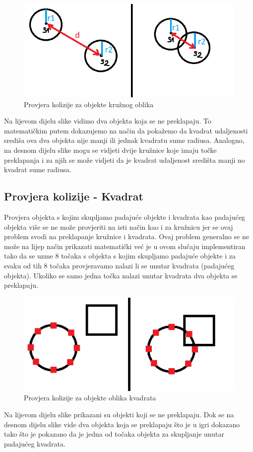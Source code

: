 \documentclass[times, utf8, zavrsni]{fer}
\begin{document}
		\begin{figure}[H]
			\includegraphics[scale=0.6]{"slike/circlekolizija.png"} 
			\centering
			\caption{Provjera kolizije za objekte kružnog oblika}
			\label{fig:kolizijacircle}
		\end{figure}
	
	Na lijevom dijelu slike vidimo dva objekta koja se ne preklapaju. To matematičkim putem dokazujemo na način da pokažemo da kvadrat udaljenosti središa ova dva objekta nije manji ili jednak kvadratu sume radiusa. Analogno, na desnom dijelu slike
	mogu se vidjeti dvije kružnice koje imaju točke preklapanja i za njih se može vidjeti da je kvadrat udaljenost središta manji no kvadrat sume radiusa. 
	
	\subsection{Provjera kolizije - Kvadrat}
	Provjera objekta s kojim skupljamo padajuće objekte i kvadrata kao padajućeg objekta više se ne može provjeriti na isti način kao i za kružnicu jer se ovaj problem svodi na preklapanje kružnice i kvadrata.
	Ovaj problem generalno se ne može na lijep način prikazati matematički već je u ovom slučaju implementiran tako da se uzme 8 točaka s objekta s kojim skupljamo padajuće objekte i za svaku od tih 8 točaka provjeravamo nalazi li se unutar 
	kvadrata (padajućeg objekta). Ukoliko se samo jedna točka nalazi unutar kvadrata dva objekta se preklapaju. 
	
			\begin{figure}[H]
			\includegraphics[scale=0.6]{"slike/squarekolizija.png"} 
			\centering
			\caption{Provjera kolizije za objekte oblika kvadrata}
			\label{fig:kolizijasquare}
		\end{figure}
		Na lijevom dijelu slike prikazani su objekti koji se ne preklapaju. Dok se na desnom dijelu slike vide dva objekta koja se preklapaju što je u igri dokazano tako što je pokazano da je jedna od točaka objekta za skupljanje unutar padajućeg kvadrata.
	
\end{document}
